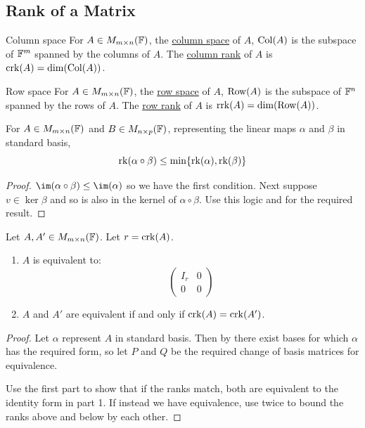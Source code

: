 \documentclass[../Main.tex]{subfiles}
\begin{document}
\subsection{Rank of a Matrix}
\begin{definition}{Column space}
    For $A \in M_{m \times n}(\mathbb{F})$, the \underline{column space} of $A$, $\operatorname{Col}(A)$ is the subspace of $\mathbb{F}^m$ spanned by the columns of $A$. The \underline{column rank} of $A$ is $\operatorname{crk}(A) = \dim(\operatorname{Col}(A))$.
\end{definition}
\begin{definition}{Row space}
    For $A \in M_{m \times n}(\mathbb{F})$, the \underline{row space} of $A$, $\operatorname{Row}(A)$ is the subspace of $\mathbb{F}^n$ spanned by the rows of $A$. The \underline{row rank} of $A$ is $\operatorname{rrk}(A) = \dim(\operatorname{Row}(A))$.
\end{definition}
\begin{lemma}
    For $A \in M_{m \times n}(\mathbb{F})$ and $B \in M_{n \times p}(\mathbb{F})$, representing the linear maps $\alpha$ and $\beta$ in standard basis,
    \begin{equation*}
        \operatorname{rk}(\alpha \circ \beta) \leq \min\{\operatorname{rk}(\alpha), \operatorname{rk}(\beta)\}
    \end{equation*}
    \label{lemRankComposition}
\end{lemma}
\begin{proof}
    $\im(\alpha \circ \beta) \leq \im(\alpha)$ so we have the first condition. Next suppose $v \in \ker{\beta}$ and so is also in the kernel of $\alpha \circ \beta$. Use this logic and  for the required result.
\end{proof}
\begin{theorem}
    Let $A, A' \in M_{m \times n}(\mathbb{F})$. Let $r = \operatorname{crk}(A)$.
    \begin{enumerate}
        \item $A$ is equivalent to:
            \begin{equation*}
                \begin{pmatrix}
                    I_r & 0 \\
                    0 & 0
                \end{pmatrix}
            \end{equation*}
        \item $A$ and $A'$ are equivalent if and only if $\operatorname{crk}(A) = \operatorname{crk}(A')$.
    \end{enumerate}
    \label{thmCrkEquivalences}
\end{theorem}
\begin{proof}
    Let $\alpha$ represent $A$ in standard basis. Then by  there exist bases for which $\alpha$ has the required form, so let $P$ and $Q$ be the required change of basis matrices for equivalence.

    Use the first part to show that if the ranks match, both are equivalent to the identity form in part 1. If instead we have equivalence, use  twice to bound the ranks above and below by each other.
\end{proof}
\end{document}
